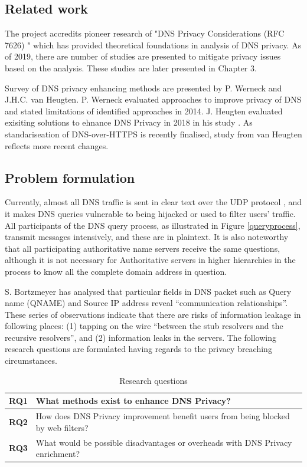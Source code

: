\documentclass[a4paper,12pt]{article}
\begin{document}
\subsection{Related work}
The project accredits pioneer research of "DNS Privacy Considerations (RFC 7626) \cite{rfc7626}" which has provided theoretical foundations in analysis of DNS privacy. 
As of 2019, there are number of studies are presented to mitigate privacy issues based on the analysis. These studies are later presented in Chapter 3.

Survey of DNS privacy enhancing methods are presented by P. Werneck and J.H.C. van Heugten. P. Werneck evaluated approaches to improve privacy of DNS and stated limitations of identified approaches\cite{werneck2014dns} in 2014. J. Heugten evaluated exisiting solutions to ehnance DNS Privacy in 2018 in his study \cite{van2018privacy}. As standariseation of DNS-over-HTTPS is recently finalised\cite{rfc8484}, study from van Heugten reflects more recent changes.

\subsection{Problem formulation}\label{problemformulation}
Currently, almost all DNS traffic is sent in clear text \cite{rfc7626} over the UDP protocol \cite{tcp2014analysis}, and it makes DNS queries vulnerable to being hijacked or used to filter users' traffic.
All participants of the DNS query process, as illustrated in Figure \ref{queryprocess}, transmit messages intensively, and these are in plaintext.
It is also noteworthy that all participating authoritative name servers receive the same questions, although it is not necessary for Authoritative servers in higher hierarchies in the process to know all the complete domain address in question.

S. Bortzmeyer has analysed that particular fields in DNS packet\cite{rfc1035} such as Query name (QNAME) and Source IP address reveal ``communication relationships\cite{rfc7626}''.
These series of observations indicate that there are risks of information leakage in following places: (1) tapping on the wire ``between the stub resolvers and the recursive resolvers'', and (2) information leaks in the servers.
The following research questions are formulated having regards to the privacy breaching circumstances.

\begin{table}[h!]
    \begin{tabular} {|p{1.2cm}|p{12.8cm}|} \hline
        \textbf{RQ1} & What methods exist to enhance DNS Privacy? \\ \hline
        \textbf{RQ2} & How does DNS Privacy improvement benefit users from being blocked by web filters?\\ \hline
        \textbf{RQ3} & What would be possible disadvantages or overheads with DNS Privacy enrichment? \\ \hline
    \end{tabular}
    \caption{Research questions}
\label{researchquestions}
\end{table}
\end{document}
